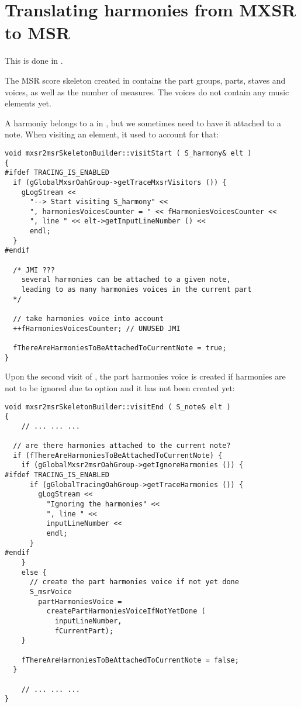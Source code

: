 \section{Translating harmonies from MXSR to MSR}

This is done in \mxsrToMsr{}.

The MSR score skeleton created in  contains the part groups, parts, staves and voices, as well as the number of measures. The voices do not contain any music elements yet.

A harmoniy belongs to a  in \mxml, but we sometimes need to have it attached to a note. When visiting an  element,  it used to account for that:%
\begin{lstlisting}[language=CPlusPlus]
void mxsr2msrSkeletonBuilder::visitStart ( S_harmony& elt )
{
#ifdef TRACING_IS_ENABLED
  if (gGlobalMxsrOahGroup->getTraceMxsrVisitors ()) {
    gLogStream <<
      "--> Start visiting S_harmony" <<
      ", harmoniesVoicesCounter = " << fHarmoniesVoicesCounter <<
      ", line " << elt->getInputLineNumber () <<
      endl;
  }
#endif

  /* JMI ???
    several harmonies can be attached to a given note,
    leading to as many harmonies voices in the current part
  */

  // take harmonies voice into account
  ++fHarmoniesVoicesCounter; // UNUSED JMI

  fThereAreHarmoniesToBeAttachedToCurrentNote = true;
}
\end{lstlisting}

Upon the second visit of , the part harmonies voice is created if harmonies are not to be ignored due to option  and it has not been created yet:
\begin{lstlisting}[language=CPlusPlus]
void mxsr2msrSkeletonBuilder::visitEnd ( S_note& elt )
{
	// ... ... ...

  // are there harmonies attached to the current note?
  if (fThereAreHarmoniesToBeAttachedToCurrentNote) {
    if (gGlobalMxsr2msrOahGroup->getIgnoreHarmonies ()) {
#ifdef TRACING_IS_ENABLED
      if (gGlobalTracingOahGroup->getTraceHarmonies ()) {
        gLogStream <<
          "Ignoring the harmonies" <<
          ", line " <<
          inputLineNumber <<
          endl;
      }
#endif
    }
    else {
      // create the part harmonies voice if not yet done
      S_msrVoice
        partHarmoniesVoice =
          createPartHarmoniesVoiceIfNotYetDone (
            inputLineNumber,
            fCurrentPart);
    }

    fThereAreHarmoniesToBeAttachedToCurrentNote = false;
  }

	// ... ... ...
}
\end{lstlisting}

